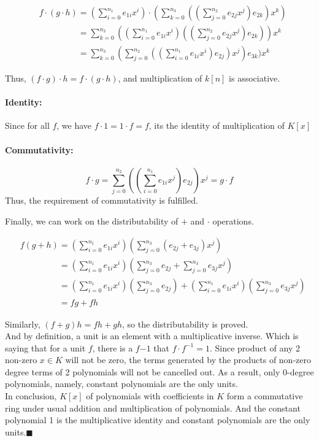 \documentclass[11pt]{article}
\begin{document}
				\begin{align}
					&f \cdot (g \cdot h) = (\sum_{i = 0}^{n_1} e_{1i}x^i) \cdot (\sum_{k = 0}^{n_3} ((\sum_{j = 0}^{n_2} e_{2j}x^j)e_{2k})x^k)\nonumber\\
					&\phantom{(f \cdot g) \cdot h} = \sum_{k = 0}^{n_3} ((\sum_{i = 0}^{n_1} e_{1i}x^i)((\sum_{j = 0}^{n_2} e_{2j}x^j)e_{2k}))x^k\nonumber\\
					&\phantom{(f \cdot g) \cdot h} = \sum_{k = 0}^{n_3}(\sum_{j = 0}^{n_2} ((\sum_{i = 0}^{n_1} e_{1i}x^i)e_{2j})x^j)e_{3k})x^k\nonumber
				\end{align}
				
				Thus, $(f \cdot g) \cdot h = f \cdot (g \cdot h)$, and multiplication of $k[n]$ is associative.
				
				\paragraph{Identity:}
					Since for all $f$, we have $f \cdot 1 = 1 \cdot f = f$, its the identity of multiplication of $K[x]$
				\paragraph{Commutativity:}
					\[f \cdot g = \sum_{j = 0}^{n_2} ((\sum_{i = 0}^{n_1} e_{1i}x^j)e_{2j})x^j = g \cdot f\]
				Thus, the requirement of commutativity is fulfilled.
				
				Finally, we can work on the distributability of $+$ and $\cdot$ operations.
				
				\begin{align}
					&f(g + h) = (\sum_{i = 0}^{n_1} e_{1i}x^i)(\sum_{j = 0}^{n_3} (e_{2j} + e_{3j})x^j)\nonumber\\
					&\phantom{f(g + h)} = (\sum_{i = 0}^{n_1} e_{1i}x^i)(\sum_{j = 0}^{n_3} e_{2j} + \sum_{j = 0}^{n_3} e_{3j}x^j)\nonumber\\
					&\phantom{f(g + h)} = (\sum_{i = 0}^{n_1} e_{1i}x^i)(\sum_{j = 0}^{n_3} e_{2j}) + (\sum_{i = 0}^{n_1} e_{1i}x^i)(\sum_{j = 0}^{n_3} e_{3j}x^j)\nonumber\\
					&\phantom{f(g + h)} = fg + fh\nonumber
				\end{align}
				
				Similarly, $(f + g)h = fh + gh$, so the distributability is proved.\\
				
				And by definition, a unit is an element with a multiplicative inverse. Which is saying that for a unit $f$, there is a $f{-1}$ that $f \cdot f^{-1} = 1$. Since product of any 2 non-zero $x \in K$ will not be zero, the terms generated by the products of non-zero degree terms of 2 polynomials will not be cancelled out. As a result, only 0-degree polynomials, namely, constant polynomials are the only units.\\
				
				In conclusion, $K[x]$ of polynomials with coefficients in $K$ form a commutative ring under usual addition and multiplication of polynomials. And the constant polynomial 1 is the multiplicative identity and constant polynomials are the only units.$\blacksquare$
				
				
\end{document}
